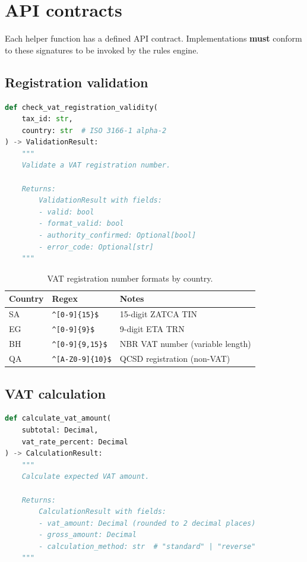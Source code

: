 \section{API contracts}

Each helper function has a defined API contract. Implementations \textbf{must}
conform to these signatures to be invoked by the rules engine.

\subsection{Registration validation}

\begin{lstlisting}[language=Python,basicstyle=\ttfamily\small,caption={Registration validator API contract.}]
def check_vat_registration_validity(
    tax_id: str,
    country: str  # ISO 3166-1 alpha-2
) -> ValidationResult:
    """
    Validate a VAT registration number.
    
    Returns:
        ValidationResult with fields:
        - valid: bool
        - format_valid: bool
        - authority_confirmed: Optional[bool]
        - error_code: Optional[str]
    """
\end{lstlisting}

\begin{table}[htbp]
\centering
\caption{VAT registration number formats by country.}
\label{tab:vat-formats}
\footnotesize
\begin{tabularx}{\linewidth}{@{}l l X@{}}
\toprule
\textbf{Country} & \textbf{Regex} & \textbf{Notes} \\ \midrule
SA & \verb|^[0-9]{15}$| & 15-digit ZATCA TIN \\
EG & \verb|^[0-9]{9}$| & 9-digit ETA TRN \\
BH & \verb|^[0-9]{9,15}$| & NBR VAT number (variable length) \\
QA & \verb|^[A-Z0-9]{10}$| & QCSD registration (non-VAT) \\
\bottomrule
\end{tabularx}
\end{table}

\subsection{VAT calculation}

\begin{lstlisting}[language=Python,basicstyle=\ttfamily\small,caption={VAT calculator API contract.}]
def calculate_vat_amount(
    subtotal: Decimal,
    vat_rate_percent: Decimal
) -> CalculationResult:
    """
    Calculate expected VAT amount.
    
    Returns:
        CalculationResult with fields:
        - vat_amount: Decimal (rounded to 2 decimal places)
        - gross_amount: Decimal
        - calculation_method: str  # "standard" | "reverse"
    """
\end{lstlisting}

